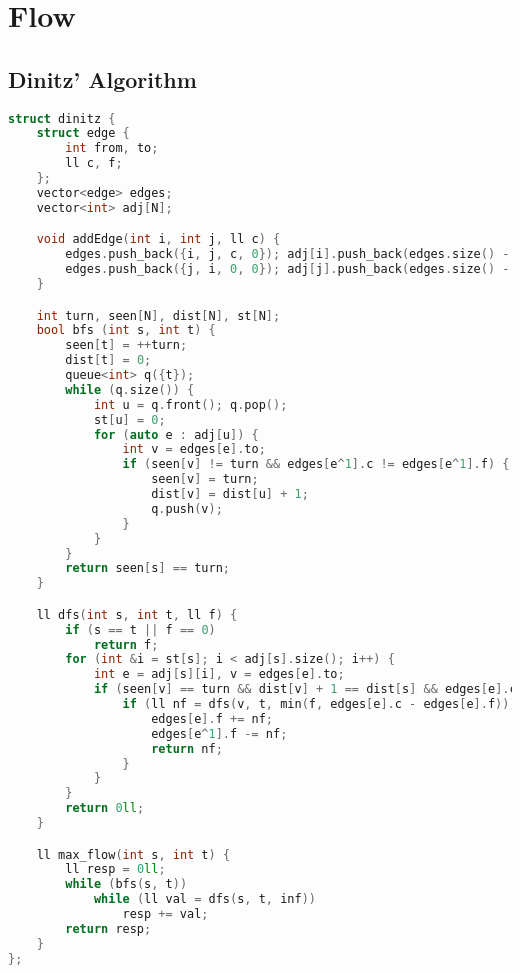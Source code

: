 \documentclass{article}
\begin{document}
\section{Flow}
\subsection{Dinitz' Algorithm}
\begin{lstlisting}[language=C++]
struct dinitz {
	struct edge {
		int from, to;
		ll c, f;
	};
	vector<edge> edges;
	vector<int> adj[N];

	void addEdge(int i, int j, ll c) {
		edges.push_back({i, j, c, 0}); adj[i].push_back(edges.size() - 1);
		edges.push_back({j, i, 0, 0}); adj[j].push_back(edges.size() - 1);
	}

	int turn, seen[N], dist[N], st[N];
	bool bfs (int s, int t) {
		seen[t] = ++turn;
		dist[t] = 0; 
		queue<int> q({t});
		while (q.size()) {
			int u = q.front(); q.pop();
			st[u] = 0;
			for (auto e : adj[u]) {
				int v = edges[e].to;
				if (seen[v] != turn && edges[e^1].c != edges[e^1].f) {
					seen[v] = turn;
					dist[v] = dist[u] + 1;
					q.push(v);
				}
			}
		}
		return seen[s] == turn;
	}

	ll dfs(int s, int t, ll f) {
		if (s == t || f == 0)
			return f;
		for (int &i = st[s]; i < adj[s].size(); i++) {
			int e = adj[s][i], v = edges[e].to;
			if (seen[v] == turn && dist[v] + 1 == dist[s] && edges[e].c > edges[e].f) {
				if (ll nf = dfs(v, t, min(f, edges[e].c - edges[e].f))) {
					edges[e].f += nf;
					edges[e^1].f -= nf;
					return nf;
				}
			}
		}
		return 0ll;
	}

	ll max_flow(int s, int t) {
		ll resp = 0ll;
		while (bfs(s, t))
			while (ll val = dfs(s, t, inf))
				resp += val;
		return resp;
	}
};
\end{lstlisting}
\end{document}
